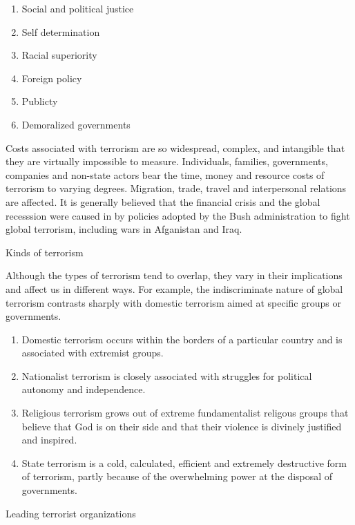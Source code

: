 \documentclass[
  openany]{book}
\providecommand{\tightlist}{%
  \setlength{\itemsep}{0pt}\setlength{\parskip}{0pt}}
\begin{document}
\begin{enumerate}
\def\labelenumi{\arabic{enumi}.}
\tightlist
\item
  Social and political justice
\item
  Self determination
\item
  Racial superiority
\item
  Foreign policy
\item
  Publicty
\item
  Demoralized governments
\end{enumerate}

Costs associated with terrorism are so widespread, complex, and intangible that they are virtually impossible to measure. Individuals, families, governments, companies and non-state actors bear the time, money and resource costs of terrorism to varying degrees. Migration, trade, travel and interpersonal relations are affected. It is generally believed that the financial crisis and the global recesssion were caused in by policies adopted by the Bush administration to fight global terrorism, including wars in Afganistan and Iraq.

Kinds of terrorism

Although the types of terrorism tend to overlap, they vary in their implications and affect us in different ways. For example, the indiscriminate nature of global terrorism contrasts sharply with domestic terrorism aimed at specific groups or governments.

\begin{enumerate}
\def\labelenumi{\arabic{enumi}.}
\tightlist
\item
  Domestic terrorism occurs within the borders of a particular country and is associated with extremist groups.
\item
  Nationalist terrorism is closely associated with struggles for political autonomy and independence.
\item
  Religious terrorism grows out of extreme fundamentalist religous groups that believe that God is on their side and that their violence is divinely justified and inspired.
\item
  State terrorism is a cold, calculated, efficient and extremely destructive form of terrorism, partly because of the overwhelming power at the disposal of governments.
\end{enumerate}

Leading terrorist organizations
\end{document}
